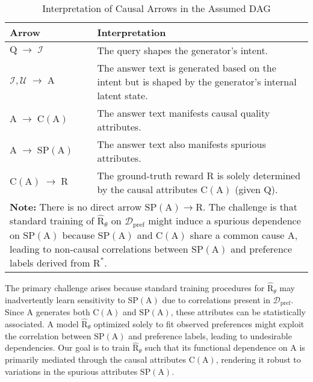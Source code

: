 \begin{table}[ht!]
\centering
\caption{Interpretation of Causal Arrows in the Assumed DAG}
\label{tab:causal_arrows}
\vspace{1em}
\begin{tabular}{p{3cm} p{9cm}} %
\toprule
\textbf{Arrow} & \textbf{Interpretation} \\
\midrule
$\mathrm{Q} \;\to\; \mathcal{I}$ & The query shapes the generator's intent. \\
$\mathcal{I}, \mathcal{U} \;\to\; \mathrm{A}$ & The answer text is generated based on the intent but is shaped by the generator's internal latent state. \\$\mathrm{A} \;\to\; \mathrm{C}(\mathrm{A})$ & The answer text manifests causal quality attributes. \\
$\mathrm{A} \;\to\; \mathrm{SP}(\mathrm{A})$ & The answer text also manifests spurious attributes. \\
$\mathrm{C}(\mathrm{A}) \;\to\; \mathrm{R}$ & The ground-truth reward $\mathrm{R}$ is solely determined by the causal attributes $\mathrm{C}(\mathrm{A})$ (given $\mathrm{Q}$). \\
\midrule
\multicolumn{2}{p{12cm}}{\textbf{Note:} There is no direct arrow $\mathrm{SP}(\mathrm{A}) \to \mathrm{R}$. The challenge is that standard training of $\hat{\mathrm{R}}_\theta$ on $\mathcal{D}_{\mathrm{pref}}$ might induce a spurious dependence on $\mathrm{SP}(\mathrm{A})$ because $\mathrm{SP}(\mathrm{A})$ and $\mathrm{C}(\mathrm{A})$ share a common cause $\mathrm{A}$, leading to non-causal correlations between $\mathrm{SP}(\mathrm{A})$ and preference labels derived from $\mathrm{R}^*$.} \\
\bottomrule
\end{tabular}
\end{table}

The primary challenge arises because standard training procedures for $\hat{\mathrm{R}}_\theta$ may inadvertently learn sensitivity to $\mathrm{SP}(\mathrm{A})$ due to correlations present in $\mathcal{D}_{\mathrm{pref}}$. Since $\mathrm{A}$ generates both $\mathrm{C}(\mathrm{A})$ and $\mathrm{SP}(\mathrm{A})$, these attributes can be statistically associated. A model $\hat{\mathrm{R}}_\theta$ optimized solely to fit observed preferences might exploit the correlation between $\mathrm{SP}(\mathrm{A})$ and preference labels, leading to undesirable dependencies. Our goal is to train $\hat{\mathrm{R}}_\theta$ such that its functional dependence on $\mathrm{A}$ is primarily mediated through the causal attributes $\mathrm{C}(\mathrm{A})$, rendering it robust to variations in the spurious attributes $\mathrm{SP}(\mathrm{A})$.

